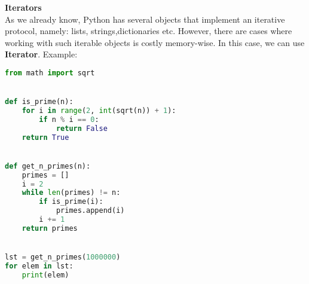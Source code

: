 \documentclass[a4paper,12pt]{article}
\begin{document}
        \textbf{Iterators}\\
        As we already know, Python has several objects that implement an iterative protocol, namely:
        lists, strings,dictionaries etc.
        However, there are cases where working with such iterable objects is costly memory-wise.
        In this case, we can use \textbf{Iterator}.
        Example:\\
        \item \begin{lstlisting}[language=Python]
        from math import sqrt


def is_prime(n):
    for i in range(2, int(sqrt(n)) + 1):
        if n % i == 0:
            return False
    return True


def get_n_primes(n):
    primes = []
    i = 2
    while len(primes) != n:
        if is_prime(i):
            primes.append(i)
        i += 1
    return primes


lst = get_n_primes(1000000)
for elem in lst:
    print(elem)

\end{lstlisting}

    \printbibliography
\end{document}
